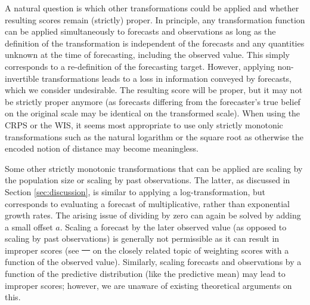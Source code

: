 \documentclass[10pt,letterpaper]{article} %
\providecommand{\DIFaddtex}[1]{{\protect\color{blue}\uwave{#1}}} %
\providecommand{\DIFdeltex}[1]{{\protect\color{red}\sout{#1}}}                      %
\providecommand{\DIFaddbegin}{} %
\providecommand{\DIFaddend}{} %
\providecommand{\DIFdelbegin}{} %
\providecommand{\DIFdelend}{} %
\providecommand{\DIFadd}[1]{\texorpdfstring{\DIFaddtex{#1}}{#1}} %
\providecommand{\DIFdel}[1]{\texorpdfstring{\DIFdeltex{#1}}{}} %
\newcommand{\DIFscaledelfig}{0.5}
\newlength{\DIFdelgraphicswidth} %
\newlength{\DIFdelgraphicsheight} %
\newcommand{\DIFaddincludegraphics}[2][]{{\color{blue}\fbox{\DIFOincludegraphics[#1]{#2}}}} %
\newcommand{\DIFdelincludegraphics}[2][]{%
\sbox{\DIFdelgraphicsbox}{\DIFOincludegraphics[#1]{#2}}%
\settoboxwidth{\DIFdelgraphicswidth}{\DIFdelgraphicsbox} %
\settoboxtotalheight{\DIFdelgraphicsheight}{\DIFdelgraphicsbox} %
\scalebox{\DIFscaledelfig}{%
\parbox[b]{\DIFdelgraphicswidth}{\usebox{\DIFdelgraphicsbox}\\[-\baselineskip] \rule{\DIFdelgraphicswidth}{0em}}\llap{\resizebox{\DIFdelgraphicswidth}{\DIFdelgraphicsheight}{%
\setlength{\unitlength}{\DIFdelgraphicswidth}%
\begin{picture}(1,1)%
\thicklines\linethickness{2pt} %
{\color[rgb]{1,0,0}\put(0,0){\framebox(1,1){}}}%
{\color[rgb]{1,0,0}\put(0,0){\line( 1,1){1}}}%
{\color[rgb]{1,0,0}\put(0,1){\line(1,-1){1}}}%
\end{picture}%
}\hspace*{3pt}}} %
} %
\DeclareRobustCommand{\DIFaddbegin}{\DIFOaddbegin \let\includegraphics\DIFaddincludegraphics} %
\DeclareRobustCommand{\DIFaddend}{\DIFOaddend \let\includegraphics\DIFOincludegraphics} %
\DeclareRobustCommand{\DIFdelbegin}{\DIFOdelbegin \let\includegraphics\DIFdelincludegraphics} %
\DeclareRobustCommand{\DIFdelend}{\DIFOaddend \let\includegraphics\DIFOincludegraphics} %
\begin{document}
A natural question is which other transformations could be applied and whether resulting scores remain (strictly) proper. In principle, any transformation function can be applied simultaneously to forecasts and observations as long as the definition of the transformation is independent of the forecasts and any quantities unknown at the time of forecasting, including the observed value. This simply corresponds to a re-definition of the forecasting target. However, applying non-invertible transformations leads to a loss in information conveyed by forecasts, which we consider undesirable. The resulting score will be proper, but it may not be strictly proper anymore (as forecasts differing from the forecaster's true belief on the original scale may be identical on the transformed scale). When using the CRPS or the WIS, it seems most appropriate to use only strictly monotonic transformations such as the natural logarithm or the square root as otherwise the encoded notion of distance may become meaningless. 

Some other strictly monotonic transformations that can be applied are scaling by the population size or scaling by past observations. The latter, as discussed in Section \ref{sec:discussion}, is similar to applying a log-transformation, but corresponds to evaluating a forecast of multiplicative, rather than exponential growth rates. The arising issue of dividing by zero can again be solved by adding a small offset $a$. Scaling a forecast by the later observed value (as opposed to scaling by past observations) is generally not permissible as it can result in improper scores (see \DIFdelbegin \DIFdel{\mbox{%
\citealt{lerchForecasterDilemmaExtreme2015} }\hskip0pt%
}\DIFdelend \DIFaddbegin \DIFadd{\mbox{%
\cite{lerchForecasterDilemmaExtreme2015} }\hskip0pt%
}\DIFaddend on the closely related topic of weighting scores with a function of the observed value). Similarly, scaling forecasts and observations by a function of the predictive distribution (like the predictive mean) may lead to improper scores; however, we are unaware of existing theoretical arguments on this. 
\end{document}
